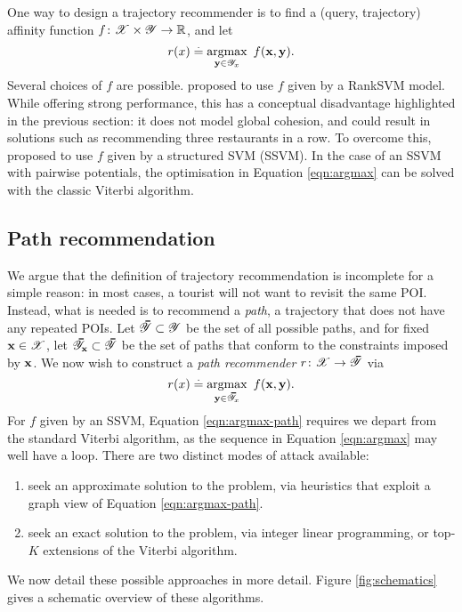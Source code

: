 One way to design a trajectory recommender is to find a (query, trajectory) affinity function $f \colon \mathscr{X} \times \mathscr{Y} \to \mathbb{R}$, and let
\begin{equation}
	\label{eqn:argmax}
	r( x ) \stackrel{.}{=} \operatorname*{argmax}_{\mathbf{y} \in \mathscr{Y}_x}~f(\mathbf{x}, \mathbf{y}).
\end{equation}
Several choices of $f$ are possible.
\citet{cikm16paper} proposed to use $f$ given by a RankSVM model. %
While offering strong performance, this has a conceptual disadvantage highlighted in the previous section:
it does not model global cohesion, and could result in solutions such as recommending three restaurants in a row.
To overcome this, \citet{Chen:2017} proposed to use $f$ given by a structured SVM (SSVM).
In the case of an SSVM with pairwise potentials, the optimisation in Equation \ref{eqn:argmax} can be solved with the classic Viterbi algorithm.


%
\subsection{Path recommendation}

We argue that the definition of trajectory recommendation is incomplete for a simple reason:
in most cases, a tourist will not want to revisit the same POI.
Instead, what is needed is to recommend a \emph{path}, \ie a trajectory that does not have any repeated POIs.
Let $\thickbar{\YCal} \subset \YCal$ be the set of all possible paths,
and for fixed $\mathbf{x} \in \mathscr{X}$, let $\thickbar{\YCal}_{\x} \subset \thickbar{\YCal}$ be the set of paths that conform to the constraints imposed by $\mathbf{x}$.
We now wish to construct a \emph{path recommender} $r \colon \XCal \to \thickbar{\YCal}$ via
\begin{equation}
	\label{eqn:argmax-path}
	r( x ) \defEq \argmax_{\y \in \thickbar{\YCal}_x}~f(\x, \y).
\end{equation}
For $f$ given by an SSVM, Equation \ref{eqn:argmax-path} requires we depart from the standard Viterbi algorithm, as the sequence in Equation \ref{eqn:argmax} may well have a loop.
There are two distinct modes of attack available:
\begin{enumerate}
	\item seek an approximate solution to the problem,
	via heuristics that exploit a graph view of Equation \ref{eqn:argmax-path}.

	\item seek an exact solution to the problem,
	via integer linear programming,
	or top-$K$ extensions of the Viterbi algorithm. %
\end{enumerate}
We now detail these possible approaches in more detail.
Figure \ref{fig:schematics} gives a schematic overview of these algorithms.

